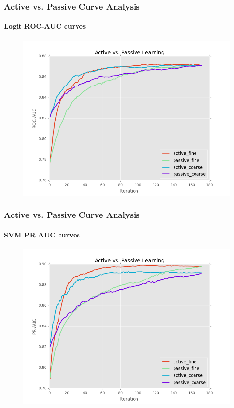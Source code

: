 \documentclass{beamer}
\begin{document}
\begin{frame}
    \frametitle{Active vs. Passive Curve Analysis}  %
    \framesubtitle{Logit ROC-AUC curves}
    \begin{figure}[!htb]
        \centering
        \includegraphics[width=0.80\columnwidth]{fig/runActPassLogReg_roc}
    \label{fig:runActPassLogReg_roc}
    \end{figure}
\end{frame}
\begin{frame}
    \frametitle{Active vs. Passive Curve Analysis}  %
    \framesubtitle{SVM PR-AUC curves}
    \begin{figure}[!htb]
        \centering
        \includegraphics[width=0.80\columnwidth]{fig/runActPassSVM_pr}
        \label{fig:ActiveVsPassivePRSVM}
    \end{figure}
\end{frame}
\end{document}
